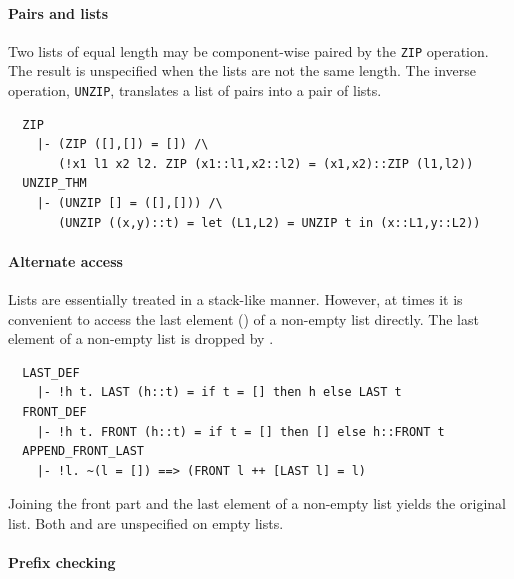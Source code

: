 \paragraph {Pairs and lists}

Two lists of equal length may be component-wise paired by
the {\small\verb+ZIP+} operation. The result is unspecified
when the lists are not the same length. The inverse operation,
{\small\verb+UNZIP+}, translates a list of pairs into a pair of
lists.
\begin{hol}
\begin{verbatim}
  ZIP
    |- (ZIP ([],[]) = []) /\
       (!x1 l1 x2 l2. ZIP (x1::l1,x2::l2) = (x1,x2)::ZIP (l1,l2))
  UNZIP_THM
    |- (UNZIP [] = ([],[])) /\
       (UNZIP ((x,y)::t) = let (L1,L2) = UNZIP t in (x::L1,y::L2))
\end{verbatim}
\end{hol}

\paragraph {Alternate access}
%
Lists are essentially treated in a stack-like manner. However, at
times it is convenient to access the last element
(\holtxt{LAST}) of a non-empty list directly. The last element
of a non-empty list is dropped by \holtxt{FRONT}.
\begin{hol}
\begin{verbatim}
  LAST_DEF
    |- !h t. LAST (h::t) = if t = [] then h else LAST t
  FRONT_DEF
    |- !h t. FRONT (h::t) = if t = [] then [] else h::FRONT t
  APPEND_FRONT_LAST
    |- !l. ~(l = []) ==> (FRONT l ++ [LAST l] = l)
\end{verbatim}
\end{hol}
%
Joining the front part and the last element of a non-empty list yields
the original list.  Both  and 
are unspecified on empty lists.


\paragraph {Prefix checking}

